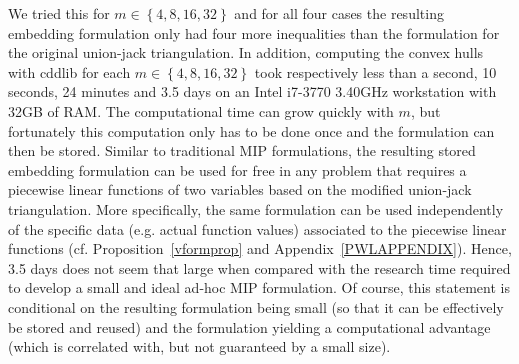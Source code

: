 \documentclass[mnsc]{informs3}
\newcommand{\set}[1]{\left\{#1\right\}}                     %
\begin{document}
We tried this for $m\in \set{4,8,16,32}$ and for all four cases the resulting embedding formulation only had four more inequalities than the formulation for the original union-jack triangulation. In addition, computing the convex hulls with cddlib for each $m\in \set{4,8,16,32}$ took respectively less than a second, 10 seconds, 24 minutes and 3.5 days on an Intel i7-3770 3.40GHz workstation with 32GB of RAM. The computational time can grow quickly with $m$, but fortunately this computation only has to be done once and the formulation can then be stored. Similar to traditional MIP formulations, the resulting stored embedding formulation can be used for free in any problem that requires a piecewise linear functions of two variables based on the modified union-jack triangulation. More specifically, the same formulation can be used independently of the specific data (e.g. actual function values) associated to the piecewise linear functions (cf. Proposition~\ref{vformprop} and Appendix~\ref{PWLAPPENDIX}).  Hence, 3.5 days does not seem that large when compared with the research time required to develop a small and ideal  ad-hoc MIP formulation. Of course, this statement is conditional on the resulting formulation being small (so that it can be effectively be stored and reused) and the formulation yielding a computational advantage (which is correlated with, but not guaranteed by a small size).  
\end{document}
